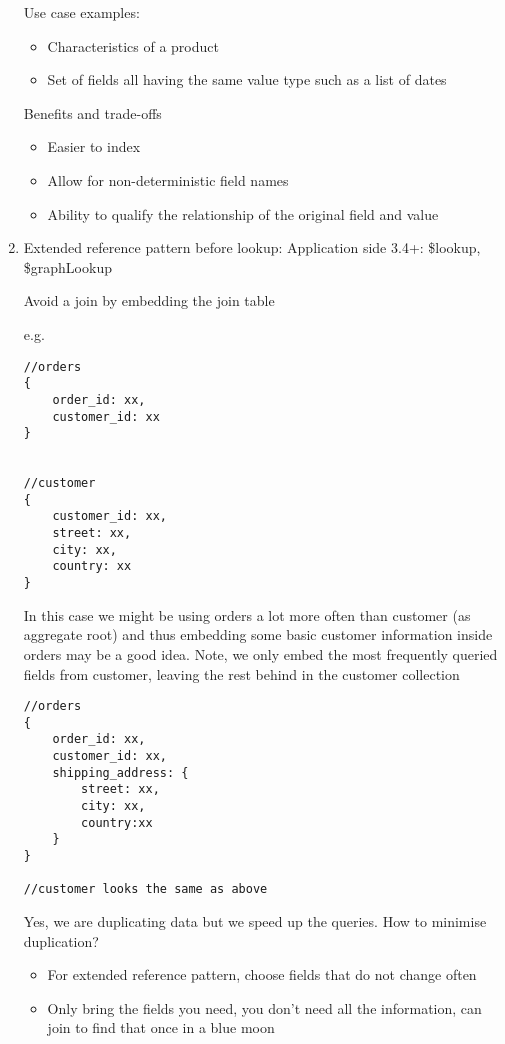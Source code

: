 \documentclass[11pt]{article}
\begin{document}
\begin{enumerate}
Use case examples:
\begin{itemize}
\item Characteristics of a product
\item Set of fields all having the same value type such as a list of dates
\end{itemize}

Benefits and trade-offs
\begin{itemize}
\item Easier to index
\item Allow for non-deterministic field names
\item Ability to qualify the relationship of the original field and value
\end{itemize}

\item Extended reference pattern
\label{sec:org3cc2947}
before lookup: Application side
3.4+: \$lookup, \$graphLookup

Avoid a join by embedding the join table

e.g.
\begin{verbatim}
//orders
{
    order_id: xx,
    customer_id: xx
}


//customer
{
    customer_id: xx,
    street: xx,
    city: xx,
    country: xx
}
\end{verbatim}

In this case we might be using orders a lot more often than customer (as aggregate root) and thus embedding some basic customer information inside orders may be a good idea.
Note, we only embed the most frequently queried fields from customer, leaving the rest behind in the customer collection
\begin{verbatim}
//orders
{
    order_id: xx,
    customer_id: xx,
    shipping_address: {
        street: xx,
        city: xx,
        country:xx
    }
}

//customer looks the same as above

\end{verbatim}

Yes, we are duplicating data but we speed up the queries.
How to minimise duplication?
\begin{itemize}
\item For extended reference pattern, choose fields that do not change often
\item Only bring the fields you need, you don't need all the information, can join to find that once in a blue moon
\end{itemize}


\end{enumerate}
\end{document}

